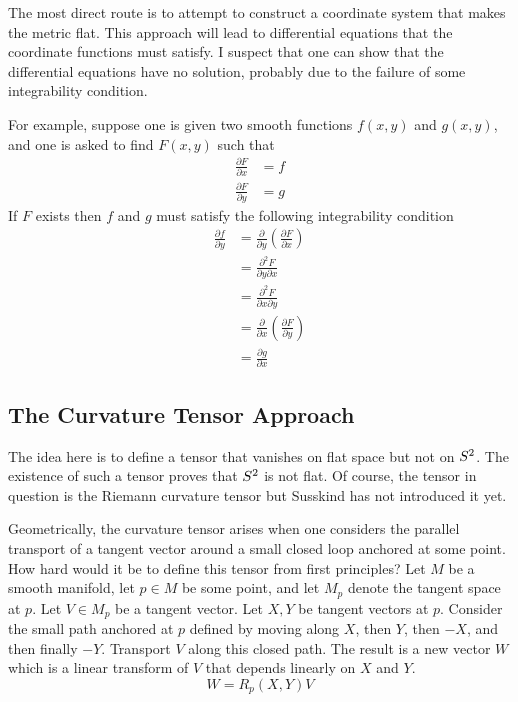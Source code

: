 \documentclass[11pt, oneside]{article}
\begin{document}
The most direct route is to attempt to construct a coordinate system that makes the metric flat.
This approach will lead to differential equations that the coordinate functions must satisfy.
I suspect that one can show that the differential equations have no solution, probably due to the failure of some
integrability condition.

For example, suppose one is given two smooth functions $f(x,y)$ and $g(x,y)$, and one is asked to find $F(x,y)$ such that
\begin{align}
	\frac{\partial F}{\partial x}	&= f \\
	\frac{\partial F}{\partial y}	&= g
\end{align}
If $F$ exists then $f$ and $g$ must satisfy the following integrability condition
\begin{equation}
\begin{split}
	\frac{\partial f}{\partial y} 	& = \frac{\partial}{\partial y} \left( \frac{\partial F}{\partial x} \right) \\
						& = \frac{\partial^2 F}{\partial y \partial x} \\
						& = \frac{\partial^2 F}{\partial x \partial y} \\
						& = \frac{\partial}{\partial x} \left( \frac{\partial F}{\partial y} \right) \\
						& = \frac{\partial g}{\partial x}
	\end{split}
\end{equation}

\subsection{The Curvature Tensor Approach}

The idea here is to define a tensor that vanishes on flat space but not on $S^2$.
The existence of such a tensor proves that $S^2$ is not flat.
Of course, the tensor in question is the Riemann curvature tensor but Susskind has not introduced it yet.

Geometrically, the curvature tensor arises when one considers the parallel transport of a tangent vector around a
small closed loop anchored at some point.
How hard would it be to define this tensor from first principles?
Let $M$ be a smooth manifold, let $p \in M$ be some point, and let $M_p$ denote the tangent space at $p$.
Let $V \in M_p$ be a tangent vector.
Let $X, Y$ be tangent vectors at $p$.
Consider the small path anchored at $p$ defined by moving along $X$, then $Y$, then $-X$, and then finally $-Y$.
Transport $V$ along this closed path.
The result is a new vector $W$ which is a linear transform of $V$ that depends linearly on $X$ and $Y$.
\begin{equation}
	W = R_p(X,Y)V
\end{equation}
\end{document}
